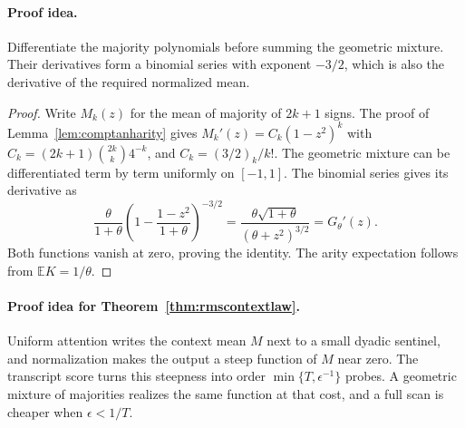 \paragraph{Proof idea.}
Differentiate the majority polynomials before summing the geometric
mixture. Their derivatives form a binomial series with exponent $-3/2$,
which is also the derivative of the required normalized mean.

\begin{proof}
Write $M_k(z)$ for the mean of majority of $2k+1$ signs. The proof
of Lemma~\ref{lem:comptanharity} gives $M_k'(z)=C_k(1-z^2)^k$ with
$C_k=(2k+1)\binom{2k}{k}4^{-k}$, and $C_k=(3/2)_k/k!$.
The geometric mixture can be differentiated term by term
uniformly on $[-1,1]$. The binomial series gives its derivative
as
\[
 \frac\theta{1+\theta}
 \left(1-\frac{1-z^2}{1+\theta}\right)^{-3/2}
 =\frac{\theta\sqrt{1+\theta}}{(\theta+z^2)^{3/2}}
 =G_\theta'(z).
\]
Both functions vanish at zero, proving the identity. The
arity expectation follows from $\mathbb E K=1/\theta$.
\end{proof}

\paragraph{Proof idea for Theorem~\ref{thm:rmscontextlaw}.}
Uniform attention writes the context mean $M$ next to a small dyadic
sentinel, and normalization makes the output a steep function of $M$
near zero. The transcript score turns this steepness into order
$\min\{T,\epsilon^{-1}\}$ probes. A geometric mixture of majorities
realizes the same function at that cost, and a full scan is cheaper
when $\epsilon<1/T$.

